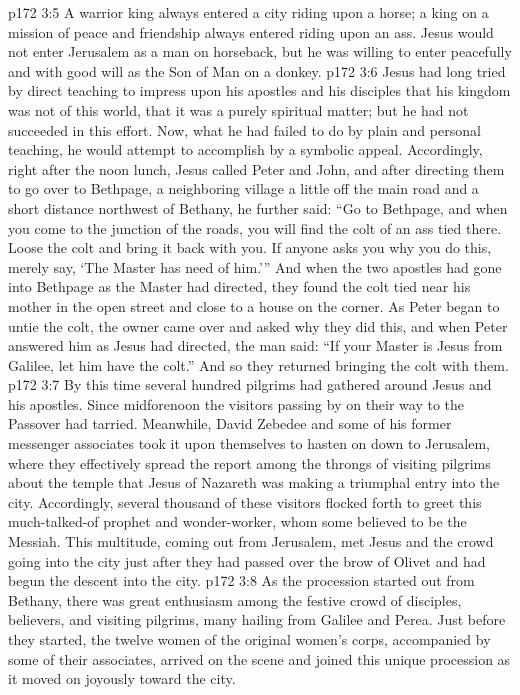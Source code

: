 \pc \vs p172 3:5 A warrior king always entered a city riding upon a horse; a king on a mission of peace and friendship always entered riding upon an ass. Jesus would not enter Jerusalem as a man on horseback, but he was willing to enter peacefully and with good will as the Son of Man on a donkey.
\pc \vs p172 3:6 Jesus had long tried by direct teaching to impress upon his apostles and his disciples that his kingdom was not of this world, that it was a purely spiritual matter; but he had not succeeded in this effort. Now, what he had failed to do by plain and personal teaching, he would attempt to accomplish by a symbolic appeal. Accordingly, right after the noon lunch, Jesus called Peter and John, and after directing them to go over to Bethpage, a neighboring village a little off the main road and a short distance northwest of Bethany, he further said: “Go to Bethpage, and when you come to the junction of the roads, you will find the colt of an ass tied there. Loose the colt and bring it back with you. If anyone asks you why you do this, merely say, ‘The Master has need of him.’” And when the two apostles had gone into Bethpage as the Master had directed, they found the colt tied near his mother in the open street and close to a house on the corner. As Peter began to untie the colt, the owner came over and asked why they did this, and when Peter answered him as Jesus had directed, the man said: “If your Master is Jesus from Galilee, let him have the colt.” And so they returned bringing the colt with them.
\vs p172 3:7 By this time several hundred pilgrims had gathered around Jesus and his apostles. Since midforenoon the visitors passing by on their way to the Passover had tarried. Meanwhile, David Zebedee and some of his former messenger associates took it upon themselves to hasten on down to Jerusalem, where they effectively spread the report among the throngs of visiting pilgrims about the temple that Jesus of Nazareth was making a triumphal entry into the city. Accordingly, several thousand of these visitors flocked forth to greet this much\hyp{}talked\hyp{}of prophet and wonder\hyp{}worker, whom some believed to be the Messiah. This multitude, coming out from Jerusalem, met Jesus and the crowd going into the city just after they had passed over the brow of Olivet and had begun the descent into the city.
\vs p172 3:8 As the procession started out from Bethany, there was great enthusiasm among the festive crowd of disciples, believers, and visiting pilgrims, many hailing from Galilee and Perea. Just before they started, the twelve women of the original women’s corps, accompanied by some of their associates, arrived on the scene and joined this unique procession as it moved on joyously toward the city.
